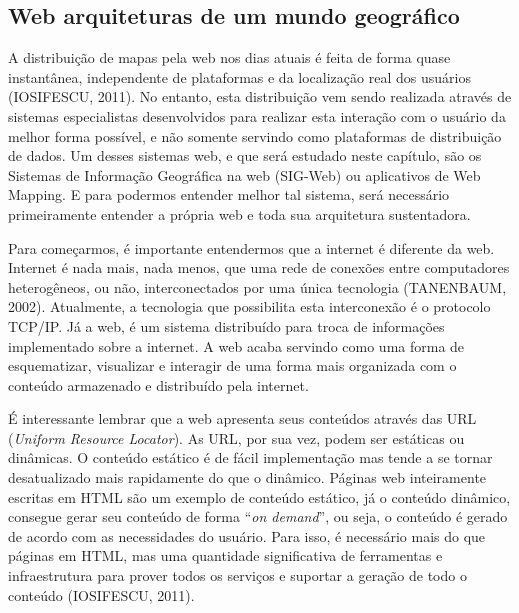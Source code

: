 		\subsection{Web arquiteturas de um mundo geográfico}
		
		A distribuição de mapas pela web nos dias atuais é feita de forma quase instantânea, independente de plataformas e da localização real dos usuários (IOSIFESCU, 2011). No entanto, esta distribuição vem sendo realizada através de sistemas especialistas desenvolvidos para realizar esta interação com o usuário da melhor forma possível, e não somente servindo como plataformas de distribuição de dados. Um desses sistemas web, e que será estudado neste capítulo, são os Sistemas de Informação Geográfica na web (SIG-Web) ou aplicativos de Web Mapping. E para podermos entender melhor tal sistema, será necessário primeiramente entender a própria web e toda sua arquitetura sustentadora.
		
		Para começarmos, é importante entendermos que a internet é diferente da web. Internet é nada mais, nada menos, que uma rede de conexões entre computadores heterogêneos, ou não, interconectados por uma única tecnologia (TANENBAUM, 2002). Atualmente, a tecnologia que possibilita esta interconexão é o protocolo TCP/IP. Já a web, é um sistema distribuído para troca de informações implementado sobre a internet. A web acaba servindo como uma forma de esquematizar, visualizar e interagir de uma forma mais organizada com o conteúdo armazenado e distribuído pela internet.
		
		É interessante lembrar que a web apresenta seus conteúdos através das URL (\textit{Uniform Resource Locator}). As URL, por sua vez, podem ser estáticas ou dinâmicas. O conteúdo estático é de fácil implementação mas tende a se tornar desatualizado mais rapidamente do que o dinâmico. Páginas web inteiramente escritas em HTML são um exemplo de conteúdo estático, já o conteúdo dinâmico, consegue gerar seu conteúdo de forma “\textit{on demand}”, ou seja, o conteúdo é gerado de acordo com as necessidades do usuário. Para isso, é necessário mais do que páginas em HTML, mas uma quantidade significativa de ferramentas e infraestrutura para prover todos os serviços e suportar a geração de todo o conteúdo (IOSIFESCU, 2011).
		
